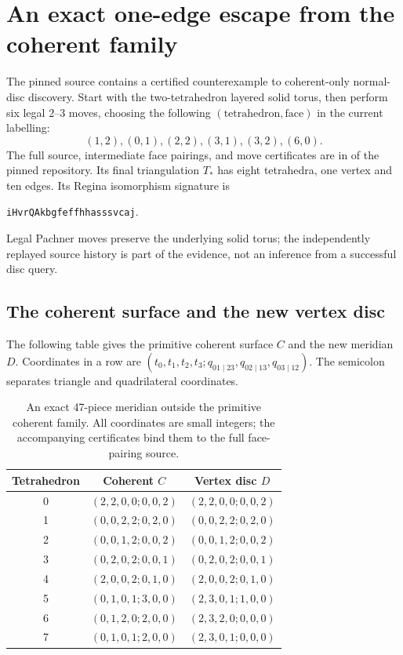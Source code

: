 \section{An exact one-edge escape from the coherent family}
\label{sec:one-edge}

The pinned source contains a certified counterexample to coherent-only
normal-disc discovery. Start with the two-tetrahedron layered solid torus,
then perform six legal $2$--$3$ moves, choosing the following
$(\text{tetrahedron},\text{face})$ in the current labelling:
\[
                 (1,2),(0,1),(2,2),(3,1),(3,2),(6,0).
\]
The full source, intermediate face pairings, and move certificates are in
 of the
pinned repository. Its final triangulation $T_*$ has eight tetrahedra,
one vertex and ten edges. Its Regina isomorphism signature is
\begin{center}\texttt{iHvrQAkbgfeffhhasssvcaj}.\end{center}
Legal Pachner moves preserve the
underlying solid torus; the independently replayed source history is
part of the evidence, not an inference from a successful disc query.

\subsection{The coherent surface and the new vertex disc}

The following table gives the primitive coherent surface $C$ and the new
meridian $D$. Coordinates in a row are
$(t_0,t_1,t_2,t_3;q_{01\mid23},q_{02\mid13},q_{03\mid12})$.
The semicolon separates triangle and quadrilateral coordinates.
\begin{table}[htbp]
\centering
\begin{tabular}{@{}c cc@{}}
\toprule
Tetrahedron & Coherent $C$ & Vertex disc $D$\\
\midrule
0 & $(2,2,0,0;0,0,2)$ & $(2,2,0,0;0,0,2)$\\
1 & $(0,0,2,2;0,2,0)$ & $(0,0,2,2;0,2,0)$\\
2 & $(0,0,1,2;0,0,2)$ & $(0,0,1,2;0,0,2)$\\
3 & $(0,2,0,2;0,0,1)$ & $(0,2,0,2;0,0,1)$\\
4 & $(2,0,0,2;0,1,0)$ & $(2,0,0,2;0,1,0)$\\
5 & $(0,1,0,1;3,0,0)$ & $(2,3,0,1;1,0,0)$\\
6 & $(0,1,2,0;2,0,0)$ & $(2,3,2,0;0,0,0)$\\
7 & $(0,1,0,1;2,0,0)$ & $(2,3,0,1;0,0,0)$\\
\bottomrule
\end{tabular}
\caption{An exact 47-piece meridian outside the primitive coherent family.
All coordinates are small integers; the accompanying certificates bind
them to the full face-pairing source.}
\label{tab:coordinates}
\end{table}

